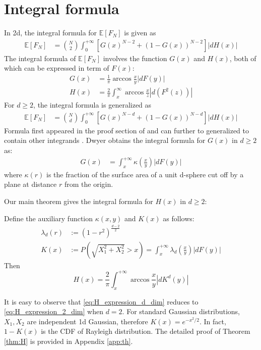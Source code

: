 \documentclass{aptpub}
\def\E{\mathbb{E}}
\begin{document}
\section{Integral formula}\label{sec:int_f}
In 2d, the integral formula for $\E[F_N]$ is given as
\begin{align}
     \E[F_N] &= \binom{N}{2} \int_0^{+\infty} 
     \left[G(x)^{N-2} + (1-G(x))^{N-2} \right]|dH(x)| 
     \label{eq:E_F_N_2_d}
\end{align}
The integral formula of $\E[F_N]$ involves the function $G(x)$ and $H(x)$,
both of which can be expressed in term of $F(x)$:
\begin{align}
   G(x) &=\frac{1}{\pi} \arccos\frac{x}{y} |dF(y)| \\
     H(x) &= \frac{2}{\pi} \int_x^{\infty} \arccos \frac{x}{z} |d(F^2(z))|
     \label{eq:H_expression_2_dim}
\end{align}
For $d\geq 2$, the integral formula is generalized as
\begin{align}
     \E[F_N] &= \binom{N}{d} \int_0^{+\infty} 
     \left[G(x)^{N-d} + (1-G(x))^{N-d} \right]|dH(x)| 
     \label{eq:E_F_N_d}
\end{align}
Formula first appeared in the proof section of \cite{raynaud1970enveloppe}
and can further to generalized to contain other integrands \cite{barany2008random}.
Dwyer obtains the integral formula for $G(x)$ in $d\geq 2$ as:
\begin{align}\label{eq:G_d_kappa}
     G(x) & = \int_x^{+\infty} \kappa(\frac{x}{y}) |dF(y)|
\end{align}
where $\kappa(r)$ is the fraction of the surface area of a unit d-sphere
cut off by a plane at distance $r$ from the origin.

Our main theorem gives the integral formula for $H(x)$ in $d\geq 2$:
\begin{theorem}\label{thm:H}
Define the auxiliary function $\kappa(x,y)$ and $K(x)$ as follows: 
     \begin{align}
          \lambda_d(r) & :=(1-r^2)^{\frac{d-2}{2}}
          \label{eq:lambda_r}\\
          K(x) &:=P(\sqrt{X_1^2+X_2^2}>x)=
          \int_x^{+\infty}
          \lambda_d \left(\frac{x}{y} \right)|dF(y)|
          \label{eq:K_x}
      \end{align}
Then
\begin{equation}
     H(x) = \frac{2}{\pi}
     \int_x^{+\infty} \arccos\frac{x}{y}
     |d K^d(y)|\label{eq:H_expression_d_dim}
\end{equation}
\end{theorem}
It is easy to observe that \eqref{eq:H_expression_d_dim} reduces to 
\eqref{eq:H_expression_2_dim} when $d=2$.
For standard Gaussian distributions, $X_1, X_2$ are independent 1d
Gaussian, therefore $K(x) = e^{-x^2/2}$. In fact, $1-K(x)$ is the CDF of Rayleigh distribution.
The detailed proof of Theorem \ref{thm:H}
is provided in Appendix \ref{app:th}.
\end{document}
